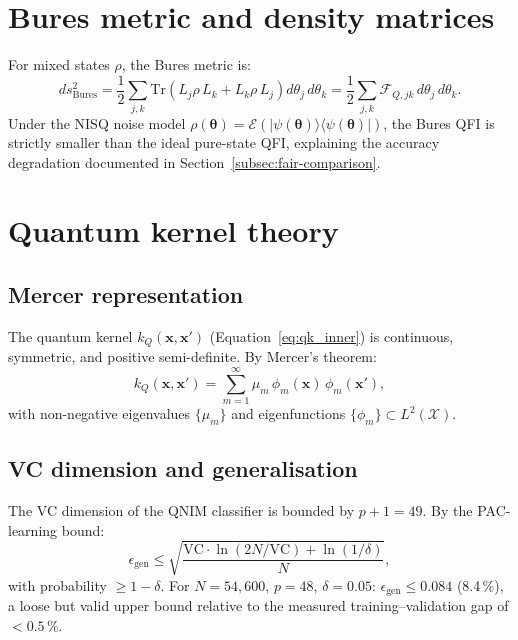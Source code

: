\documentclass[11pt,a4paper, english]{book}
\theoremstyle{plain}
\theoremstyle{definition}
\numberwithin{equation}{chapter}
\numberwithin{figure}{chapter}
\numberwithin{table}{chapter}
\begin{document}
\section{Bures metric and density matrices}
\label{app:bures}

For mixed states $\rho$, the Bures metric is:
\begin{equation}
  \label{eq:bures}
  ds_\mathrm{Bures}^2 = \frac{1}{2}\sum_{j,k}
    \mathrm{Tr}\!\left(L_j\rho\,L_k + L_k\rho\,L_j\right)
    d\theta_j\,d\theta_k
  = \frac{1}{2}\sum_{j,k}\mathcal{F}_{Q,jk}\,d\theta_j\,d\theta_k.
\end{equation}
Under the NISQ noise model
$\rho(\boldsymbol{\theta})=\mathcal{E}(|\psi(\boldsymbol{\theta})\rangle
\langle\psi(\boldsymbol{\theta})|)$,
the Bures QFI is strictly smaller than the ideal pure-state QFI,
explaining the accuracy degradation documented in
Section~\ref{subsec:fair-comparison}.

\section{Quantum kernel theory}
\label{app:kernel-theory}

\subsection{Mercer representation}
\label{app:mercer}

The quantum kernel $k_Q(\mathbf{x},\mathbf{x}')$ (Equation~\ref{eq:qk_inner})
is continuous, symmetric, and positive semi-definite. By Mercer's theorem:
\begin{equation}
  \label{eq:mercer}
  k_Q(\mathbf{x},\mathbf{x}') = \sum_{m=1}^\infty
    \mu_m\,\phi_m(\mathbf{x})\,\phi_m(\mathbf{x}'),
\end{equation}
with non-negative eigenvalues $\{\mu_m\}$ and eigenfunctions
$\{\phi_m\}\subset L^2(\mathcal{X})$.

\subsection{VC dimension and generalisation}
\label{app:vc-dim}

The VC dimension of the QNIM classifier is bounded by $p+1=49$.
By the PAC-learning bound:
\begin{equation}
  \label{eq:pac_bound}
  \epsilon_\mathrm{gen} \leq \sqrt{\frac{\mathrm{VC}\cdot\ln(2N/\mathrm{VC})
    + \ln(1/\delta)}{N}},
\end{equation}
with probability $\geq 1-\delta$. For $N=54{,}600$, $p=48$, $\delta=0.05$:
$\epsilon_\mathrm{gen}\leq 0.084$ (8.4\,\%), a loose but valid upper bound
relative to the measured training--validation gap of $<0.5\,\%$.
\end{document}
